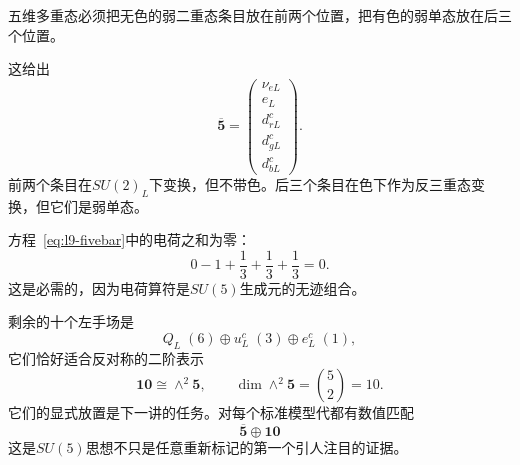 
五维多重态必须把无色的弱二重态条目放在前两个位置，把有色的弱单态放在后三个位置。

\begin{classroomqa}
\end{classroomqa}

这给出
\begin{equation}
\overline{\mathbf5}
=
\begin{pmatrix}
\nu_{eL}\\
e_L\\
d^c_{rL}\\
d^c_{gL}\\
d^c_{bL}
\end{pmatrix}.
\label{eq:l9-fivebar}
\end{equation}
前两个条目在\(SU(2)_L\)下变换，但不带色。后三个条目在色下作为反三重态变换，但它们是弱单态。

\begin{classroomqa}
\end{classroomqa}

方程~\eqref{eq:l9-fivebar}中的电荷之和为零：
\begin{equation}
0-1+\frac13+\frac13+\frac13=0.
\label{eq:l9-fivebar-charge-sum}
\end{equation}
这是必需的，因为电荷算符是\(SU(5)\)生成元的无迹组合。

\begin{classroomqa}
\end{classroomqa}

剩余的十个左手场是
\begin{equation}
Q_L\;(6)
\oplus
u^c_L\;(3)
\oplus
e^c_L\;(1),
\end{equation}
它们恰好适合反对称的二阶表示
\begin{equation}
\mathbf{10}\cong\wedge^2\mathbf5,
\qquad
\dim\wedge^2\mathbf5=\binom52=10.
\label{eq:l9-ten-preview}
\end{equation}
它们的显式放置是下一讲的任务。对每个标准模型代都有数值匹配
\begin{equation}
\overline{\mathbf5}\oplus\mathbf{10}
\end{equation}
这是\(SU(5)\)思想不只是任意重新标记的第一个引人注目的证据。

